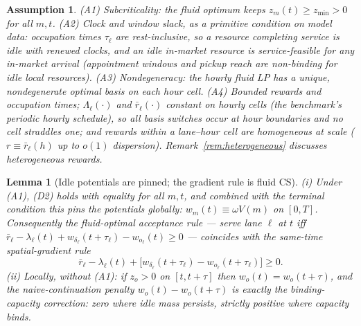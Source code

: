 \documentclass[11pt]{article}
\newtheorem{lemma}{Lemma}
\newtheorem{assumption}{Assumption}
\begin{document}
\begin{assumption}
\label{ass:regime}
(A1) Subcriticality: the fluid optimum keeps $z_m(t) \geq z_{\min} > 0$
for all $m, t$. (A2) Clock and window slack, as a primitive condition
on model data: occupation times $\tau_{\ell}$ are rest-inclusive, so a
resource completing service is idle with renewed clocks, and an idle
in-market resource is service-feasible for any in-market arrival
(appointment windows and pickup reach are non-binding for idle local
resources). (A3) Nondegeneracy: the hourly fluid LP has a unique,
nondegenerate optimal basis on each hour cell. (A4) Bounded rewards
and occupation times; $\Lambda_{\ell}(\cdot)$ and
$\bar{r}_{\ell}(\cdot)$ constant on hourly cells (the benchmark's
periodic hourly schedule), so all basis switches occur at hour
boundaries and no cell straddles one; and rewards within a
lane--hour cell are homogeneous at scale ($r \equiv \bar{r}_{\ell}(h)$
up to $o(1)$ dispersion). Remark~\ref{rem:heterogeneous} discusses
heterogeneous rewards.
\end{assumption}

\begin{lemma}[Idle potentials are pinned; the gradient rule is fluid CS]
\label{lem:flat}
(i) Under (A1), (D2) holds with equality for all $m, t$, and combined
with the terminal condition this pins the potentials globally:
$w_m(t) \equiv \omega V(m)$ on $[0, T]$. Consequently the
fluid-optimal acceptance rule ---
serve lane $\ell$ at $t$ iff
$\bar{r}_{\ell} - \lambda_{\ell}(t) + w_{\delta_{\ell}}(t + \tau_{\ell})
- w_{o_{\ell}}(t) \geq 0$ --- coincides with the same-time
spatial-gradient rule
\begin{equation}
  \bar{r}_{\ell} - \lambda_{\ell}(t)
  + \bigl[ w_{\delta_{\ell}}(t + \tau_{\ell})
  - w_{o_{\ell}}(t + \tau_{\ell}) \bigr] \geq 0.
  \label{eq:fluidrule}
\end{equation}
(ii) Locally, without (A1): if $z_o > 0$ on $[t, t + \tau]$ then
$w_o(t) = w_o(t + \tau)$, and the naive-continuation penalty
$w_o(t) - w_o(t + \tau)$ is exactly the binding-capacity correction:
zero where idle mass persists, strictly positive where capacity binds.
\end{lemma}
\end{document}
